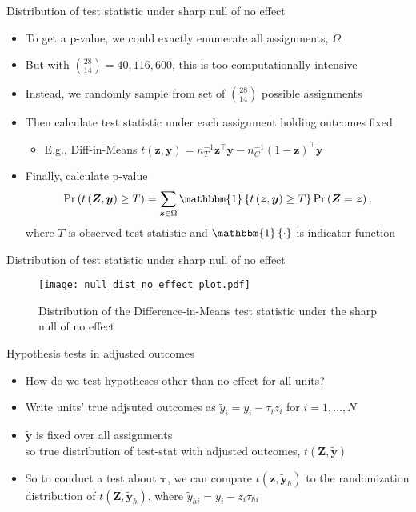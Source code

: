 \documentclass[table, xcolor = {dvipsnames}, 9pt]{beamer}
\theoremstyle{plain}
\begin{document}
\begin{frame}{Distribution of test statistic under sharp null of no effect} \vfill
\begin{itemize}
\item To get a p-value, we could exactly enumerate all assignments, $\Omega$ \pause \vfill
\item But with $\binom{28}{14} = 40,116,600$, this is too computationally intensive \pause \vfill
\item Instead, we randomly sample from set of $\binom{28}{14}$ possible assignments \pause \vfill
\item Then calculate test statistic under each assignment holding outcomes fixed \vfill
\vspace{1em}
\begin{itemize}
\item[] E.g., Diff-in-Means $t\left(\bm{z}, \bm{y}\right) = n_T^{-1} \bm{z}^{\top}\bm{y} - n_C^{-1} \left(1 - \bm{z}\right)^{\top} \bm{y}$
\end{itemize} \vfill
\vspace{1em} \pause \vfill
\item Finally, calculate p-value \vfill
\begin{equation*}
\Pr\left(t\left(\bm{Z},\bm{y}\right) \geq T\right) = \sum \limits_{\bm{z}\in \Omega} \mathbbm{1}\left\{t\left(\bm{z}, \bm{y}\right) \geq T\right\} \Pr\left(\bm{Z} = \bm{z}\right),
\end{equation*}
where $T$ is observed test statistic and $\mathbbm{1}\left\{\cdot\right\}$ is indicator function
\end{itemize}
\end{frame}
\begin{frame}{Distribution of test statistic under sharp null of no effect}
\begin{figure}[H]
\texttt{[image: null\_dist\_no\_effect\_plot.pdf]}
\caption{Distribution of the Difference-in-Means test statistic under the sharp null of no effect}
\end{figure}
\end{frame}
\begin{frame}{Hypothesis tests in adjusted outcomes}
\vfill
\begin{itemize} 
\item How do we test hypotheses other than no effect for all units? \pause \vfill
\item Write units' true adjsuted outcomes as $\tilde{y}_i = y_i - \tau_i z_i$ for $i = 1, \ldots , N$ \vfill
\item $\bm{\tilde{y}}$ is fixed over all assignments \\ so true distribution of test-stat with adjusted outcomes, $t\left(\bm{Z}, \bm{\tilde{y}}\right)$\pause \vfill
\item So to conduct a test about $\bm{\tau}$, we can compare $t(\bm{z}, \bm{\tilde{y}}_{h})$ to the randomization distribution of $t(\bm{Z}, \bm{\tilde{y}}_{h})$, where $\tilde{y}_{hi} = y_i - z_i \tau_{hi}$ \vfill
\end{itemize}
\vfill
\end{frame}
\end{document}
